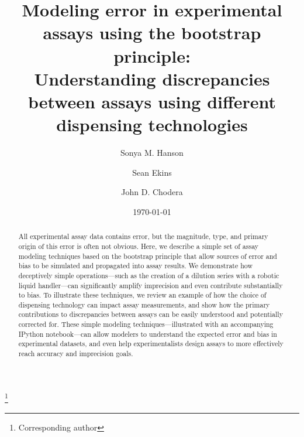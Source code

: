\documentclass[aps,pre,twocolumn,nofootinbib,superscriptaddress,linenumbers]{revtex4-1}
\begin{document}
\title{Modeling error in experimental assays using the bootstrap principle:\\
Understanding discrepancies between assays using different dispensing technologies}

\author{Sonya M. Hanson}
\author{Sean Ekins}
\author{John D. Chodera}
 \thanks{Corresponding author}

\date{\today}

\begin{abstract}

All experimental assay data contains error, but the magnitude, type, and primary origin of this error is often not obvious.
Here, we describe a simple set of assay modeling techniques based on the bootstrap principle that allow sources of error and bias to be simulated and propagated into assay results.
We demonstrate how deceptively simple operations---such as the creation of a dilution series with a robotic liquid handler---can significantly amplify imprecision and even contribute substantially to bias.
To illustrate these techniques, we review an example of how the choice of dispensing technology can impact assay measurements, and show how the primary contributions to discrepancies between assays can be easily understood and potentially corrected for.
These simple modeling techniques---illustrated with an accompanying IPython notebook---can allow modelers to understand the expected error and bias in experimental datasets, and even help experimentalists design assays to more effectively reach accuracy and imprecision goals.

\end{abstract}

\maketitle
\end{document}
